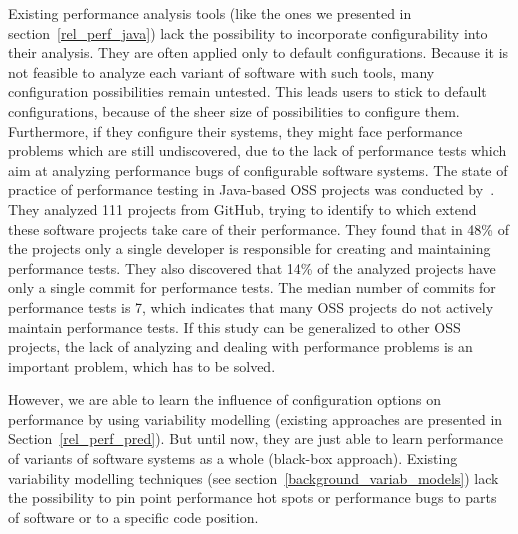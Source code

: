 Existing performance analysis tools (like the ones we presented in section~\ref{rel_perf_java}) lack the possibility to incorporate configurability into their analysis. They are often applied only to default configurations. Because it is not feasible to analyze each variant of software with such tools, many configuration possibilities remain untested. This leads users to stick to default configurations, because of the sheer size of possibilities to configure them. Furthermore, if they configure their systems, they might face performance problems which are still undiscovered, due to the lack of performance tests which aim at analyzing performance bugs of configurable software systems. The state of practice of performance testing in Java-based \ac{OSS} projects was conducted by~\cite{leitner2017exploratory}. They analyzed 111 projects from GitHub, trying to identify to which extend these software projects take care of their performance. They found that in 48\% of the projects only a single developer is responsible for creating and maintaining performance tests. They also discovered that 14\% of the analyzed projects have only a single commit for performance tests. The median number of commits for performance tests is 7, which indicates that many \ac{OSS} projects do not actively maintain performance tests. If this study can be generalized to other \ac{OSS} projects, the lack of analyzing and dealing with performance problems is an important problem, which has to be solved.

However, we are able to learn the influence of configuration options on performance by using variability modelling (existing approaches are presented in Section~\ref{rel_perf_pred}). But until now, they are just able to learn performance of variants of software systems as a whole (black-box approach). Existing variability modelling techniques (see section~\ref{background_variab_models}) lack the possibility to pin point performance hot spots or performance bugs to parts of software or to a specific code position.



